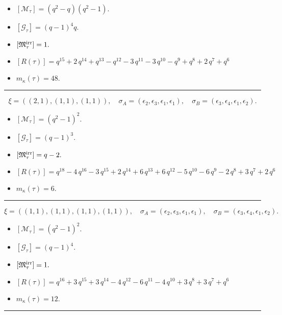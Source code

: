 \documentclass[10pt,a4paper]{amsart}
\begin{document}
\begin{itemize}
 \item $[\mathcal{M}_{\tau}] = {\left(q^{2} - q\right)} {\left(q^{2} - 1\right)} .$

 \item $[\mathcal{G}_{\tau}] = {\left(q - 1\right)}^{4} q .$

 \item $[{\frak M}_{\tau}^{\textrm{irr}}] = 1 .$

 \item $[R(\tau)] = q^{15} + 2 \, q^{14} + q^{13} - q^{12} - 3 \, q^{11} - 3 \, q^{10} - q^{9} + q^{8} + 2 \, q^{7} + q^{6} $

 \item $m_{\kappa}(\tau) = 48 .$

 \end{itemize}
\noindent\rule{8cm}{0.4pt}

$$\xi = ({(2, 1)}, {(1, 1), (1, 1)}),\quad \sigma_A = ({{\epsilon_2, \epsilon_3}}, {{\epsilon_1}, {\epsilon_1}}),\quad \sigma_B = ({{\epsilon_3, \epsilon_4}}, {{\epsilon_1}, {\epsilon_2}}).$$

\begin{itemize}
 \item $[\mathcal{M}_{\tau}] = {\left(q^{2} - 1\right)}^{2} .$

 \item $[\mathcal{G}_{\tau}] = {\left(q - 1\right)}^{3} .$

 \item $[{\frak M}_{\tau}^{\textrm{irr}}] = q - 2 .$

 \item $[R(\tau)] = q^{18} - 4 \, q^{16} - 3 \, q^{15} + 2 \, q^{14} + 6 \, q^{13} + 6 \, q^{12} - 5 \, q^{10} - 6 \, q^{9} - 2 \, q^{8} + 3 \, q^{7} + 2 \, q^{6} $

 \item $m_{\kappa}(\tau) = 6 .$

 \end{itemize}
\noindent\rule{8cm}{0.4pt}

$$\xi = ({(1, 1), (1, 1)}, {(1, 1), (1, 1)}),\quad \sigma_A = ({{\epsilon_2}, {\epsilon_3}}, {{\epsilon_1}, {\epsilon_1}}),\quad \sigma_B = ({{\epsilon_3}, {\epsilon_4}}, {{\epsilon_1}, {\epsilon_2}}).$$

\begin{itemize}
 \item $[\mathcal{M}_{\tau}] = {\left(q^{2} - 1\right)}^{2} .$

 \item $[\mathcal{G}_{\tau}] = {\left(q - 1\right)}^{4} .$

 \item $[{\frak M}_{\tau}^{\textrm{irr}}] = 1 .$

 \item $[R(\tau)] = q^{16} + 3 \, q^{15} + 3 \, q^{14} - 4 \, q^{12} - 6 \, q^{11} - 4 \, q^{10} + 3 \, q^{8} + 3 \, q^{7} + q^{6} $

 \item $m_{\kappa}(\tau) = 12 .$

 \end{itemize}
\noindent\rule{8cm}{0.4pt}
\end{document}
